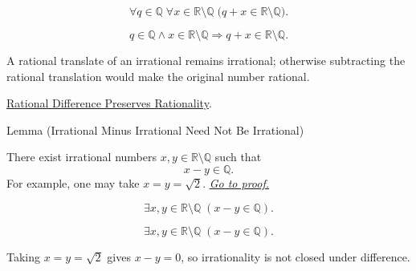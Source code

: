 \begin{remark*}
\[
\forall q\in\mathbb{Q}\;\forall x\in\mathbb{R}\setminus\mathbb{Q}\;
\bigl(q+x\in\mathbb{R}\setminus\mathbb{Q}\bigr).
\]
\end{remark*}

\begin{remark*}
\[
q\in\mathbb{Q}\land x\in\mathbb{R}\setminus\mathbb{Q}
\Longrightarrow q+x\in\mathbb{R}\setminus\mathbb{Q}.
\]
\end{remark*}

\begin{remark*}[Interpretation]
A rational translate of an irrational remains irrational; otherwise
subtracting the rational translation would make the original number rational.
\end{remark*}

\begin{dependencies}
\hyperref[lem:rational-difference-preserves-rationality]{Rational Difference Preserves Rationality}.
\end{dependencies}

\begin{lemmabox}{Lemma (Irrational Minus Irrational Need Not Be Irrational)}
\begin{lemma}
\label{lem:irrational-minus-irrational-need-not-be-irrational}
There exist irrational numbers $x,y\in\mathbb{R}\setminus\mathbb{Q}$ such
that
\[
  x-y\in\mathbb{Q}.
\]
For example, one may take $x=y=\sqrt{2}$.
\hyperref[prf:irrational-minus-irrational-need-not-be-irrational]{\textit{Go to proof.}}
\end{lemma}
\end{lemmabox}

\begin{remark*}
\[
\exists x,y\in\mathbb{R}\setminus\mathbb{Q}\;(x-y\in\mathbb{Q}).
\]
\end{remark*}

\begin{remark*}
\[
\exists x,y\in\mathbb{R}\setminus\mathbb{Q}\;(x-y\in\mathbb{Q}).
\]
\end{remark*}

\begin{remark*}[Interpretation]
Taking $x=y=\sqrt{2}$ gives $x-y=0$, so irrationality is not closed under
difference.
\end{remark*}

